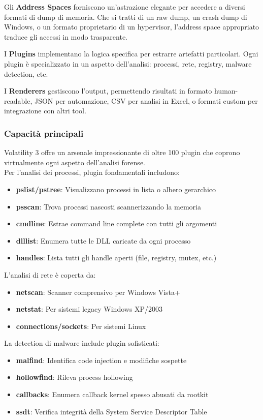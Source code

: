 Gli \textbf{Address Spaces} forniscono un'astrazione elegante per accedere a diversi formati di dump di memoria. Che si tratti di un raw dump, un crash dump di Windows, o un formato proprietario di un hypervisor, l'address space appropriato traduce gli accessi in modo trasparente.

I \textbf{Plugins} implementano la logica specifica per estrarre artefatti particolari. Ogni plugin è specializzato in un aspetto dell'analisi: processi, rete, registry, malware detection, etc.

I \textbf{Renderers} gestiscono l'output, permettendo risultati in formato human-readable, JSON per automazione, CSV per analisi in Excel, o formati custom per integrazione con altri tool.

\subsubsection{Capacità principali}
Volatility 3 offre un arsenale impressionante di oltre 100 plugin che coprono virtualmente ogni aspetto dell'analisi forense.\\
Per l'analisi dei processi, plugin fondamentali includono:
\begin{itemize}
    \item \textbf{pslist/pstree}: Visualizzano processi in lista o albero gerarchico
    \item \textbf{psscan}: Trova processi nascosti scannerizzando la memoria
    \item \textbf{cmdline}: Estrae command line complete con tutti gli argomenti
    \item \textbf{dlllist}: Enumera tutte le DLL caricate da ogni processo
    \item \textbf{handles}: Lista tutti gli handle aperti (file, registry, mutex, etc.)
\end{itemize}
L'analisi di rete è coperta da:
\begin{itemize}
    \item \textbf{netscan}: Scanner comprensivo per Windows Vista+
    \item \textbf{netstat}: Per sistemi legacy Windows XP/2003
    \item \textbf{connections/sockets}: Per sistemi Linux
\end{itemize}
La detection di malware include plugin sofisticati:
\begin{itemize}
    \item \textbf{malfind}: Identifica code injection e modifiche sospette
    \item \textbf{hollowfind}: Rileva process hollowing
    \item \textbf{callbacks}: Enumera callback kernel spesso abusati da rootkit
    \item \textbf{ssdt}: Verifica integrità della System Service Descriptor Table
\end{itemize}

